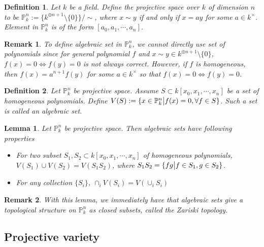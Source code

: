 \documentclass{ctexart}
\newtheorem{definition}{Definition}[section]
\newtheorem{remark}{Remark}[section]
\newtheorem{lemma}{Lemma}[section]
\begin{document}
\begin{definition}
    Let $k$ be a field.
    Define the projective space over $k$ of dimension $n$ to be $\mathbb{P}_{k}^{n} := \{k^{\oplus n + 1} \setminus \{0\}\}/\sim$,
    where $x \sim y$ if and only if $x = ay$ for some $a\in k^{\times}$.
    Element in $\mathbb{P}_{k}^{n}$ is of the form $[a_{0}, a_{1}, \cdots, a_{n}]$.
\end{definition}
\begin{remark}
    To define algebraic set in $\mathbb{P}_{k}^{n}$, we cannot directly use set of polynomials since for general polynomial $f$ and $x \sim y\in k^{\oplus n + 1} \setminus \{0\}$,
    $f(x) = 0 \iff f(y) = 0$ is not always correct.
    However, if $f$ is homogeneous, then $f(x) = a^{n + 1}f(y)$ for some $a\in k^{\times}$ so that $f(x) = 0 \iff f(y) = 0$.
\end{remark}
\begin{definition}
    Let $\mathbb{P}_{k}^{n}$ be projective space.
    Assume $S \subset k[x_{0}, x_{1}, \cdots, x_{n}]$ be a set of homogeneous polynomials.
    Define $V(S) := \{x\in \mathbb{P}_{k}^{n} \big{|} f(x) = 0, \forall f\in S\}$.
    Such a set is called an algebraic set.
\end{definition}
\begin{lemma}
    Let $\mathbb{P}_{k}^{n}$ be projective space.
    Then algebraic sets have following properties 
    \begin{itemize}
        \item For two subset $S_{1}, S_{2} \subset k[x_{0}, x_{1}, \cdots, x_{n}]$ of homogeneous polynomials,
        $V(S_{1}) \cup V(S_{2}) = V(S_{1}S_{2})$, where $S_{1}S_{2} = \{fg \big{|} f\in S_{1}, g\in S_{2}\}$.
        \item For any collection $\{S_{i}\}$, $\cap_{i} V(S_{i}) = V(\cup_{i} S_{i})$
    \end{itemize}
    \label{Lemma 2.1}
\end{lemma}
\vspace{-\baselineskip} %
\begin{remark}
    With this lemma, we immediately have that algebraic sets give a topological structure on $\mathbb{P}_{k}^{n}$ as closed subsets, called the Zariski topology.
\end{remark}

\subsection{Projective variety}
\label{subsection:Projective_Variety_Projective_variety}
\end{document}

